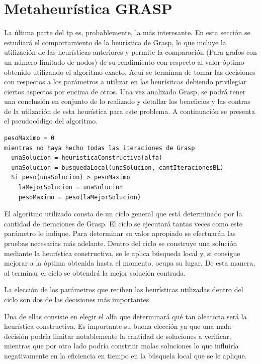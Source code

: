 \documentclass[a4paper,11pt] {article}
\begin{document}
\section{Metaheur\'istica GRASP}

La última parte del tp es, probablemente, la más interesante. En esta sección se estudiará el comportamiento de la heurística de Grasp, lo que incluye la utilización de las heurísticas anteriores y permite la comparación (Para grafos con un número limitado de nodos) de su rendimiento con respecto al valor óptimo obtenido utilizando el algoritmo exacto. Aquí se terminan de tomar las decisiones con respectos a los parámetros a utilizar en las heurísitcas debiendo privilegiar ciertos aspectos por encima de otros. Una vez analizado Grasp, se podrá tener una conclusión en conjunto de lo realizado y detallar los beneficios y las contras de la utilzación de esta heurística para este problema.
A continuación se presenta el pseudocódigo del algoritmo.

\begin{verbatim}
pesoMaximo = 0
mientras no haya hecho todas las iteraciones de Grasp
  unaSolucion = heuristicaConstructiva(alfa)
  unaSolucion = busquedaLocal(unaSolucion, cantIteracionesBL)
  Si peso(unaSolucion) > pesoMaximo
    laMejorSolucion = unaSolucion
    pesoMaximo = peso(laMejorSolucion)

\end{verbatim}

El algoritmo utilizado consta de un ciclo general que está determinado por la cantidad de iteraciones de Grasp. El ciclo se ejecutará tantas veces como este parámetro lo indique. Para determinar su valor apropiado se efectuarán las pruebas necesarias más adelante. Dentro del ciclo se construye una solución mediante la heurística constructiva, se le aplica búsqueda local y, si consigue mejorar a la óptima obtenida hasta el momento, ocupa su lugar. De esta manera, al terminar el ciclo se obtendrá la mejor solución contrada.

La elección de los parámetros que reciben las heurísticas utilizadas dentro del ciclo son dos de las decisiones más importantes.

Una de ellas consiste en elegir el alfa que determinará qué tan aleatoria será la heurística constructiva. Es importante su buena elección ya que una mala decisión podría limitar notablemente la cantidad de soluciones a verificar, mientras que por otro lado podría construir malas soluciones lo que influiría negativamente en la eficiencia en tiempo en la búsquela local que se le aplique.
\end{document}
